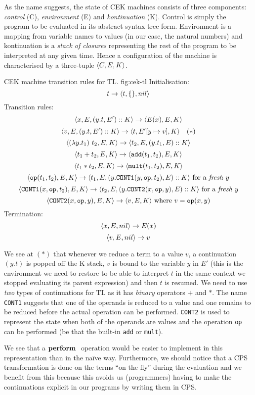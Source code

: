 \documentclass[class=article, crop=false]{standalone}
\begin{document}
As the name suggests, the state of CEK machines consists of three components:
\emph{control} (C), \emph{environment} (E) and \emph{kontinuation} (K). Control
is simply the program to be evaluated in its abstract syntax tree form.
Environment is a mapping from variable names to values (in our case, the natural
numbers) and kontinuation is a \emph{stack of closures} representing the rest
of the program to be interpreted at any given time. Hence a configuration of the
machine is characterised by a three-tuple $\langle C, E, K \rangle$.

\begin{myfigure}[.9]
{CEK machine transition rules for TL.}
{fig:cek-tl}
%
Initialisation:
$$ t \to \langle t, \{\}, nil \rangle $$
%
Transition rules:
$$ \langle x, E, (y.t, E') :: K \rangle \to \langle E(x), E, K \rangle $$
$$ \langle v, E, (y.t, E') :: K \rangle \to \langle t, E'[y \mapsto v], K \rangle \quad (*)$$
$$ \langle (\lambda y. t_1)\ t_2, E, K \rangle \to \langle t_2, E, (y.t_1, E) :: K \rangle $$
$$ \langle t_1 + t_2, E, K \rangle \to \langle \mathtt{add}(t_1, t_2), E, K \rangle $$
$$ \langle t_1 * t_2, E, K \rangle \to \langle \mathtt{mult}(t_1, t_2), E, K \rangle $$
$$ \langle \mathtt{op}(t_1, t_2), E, K \rangle \to \langle t_1, E, (y.\mathtt{CONT1}(y, \mathtt{op}, t_2), E) :: K \rangle \text{ for a \emph{fresh} $y$} $$
$$ \langle \mathtt{CONT1}(x, \mathtt{op}, t_2), E, K \rangle \to \langle t_2, E, (y.\mathtt{CONT2}(x, \mathtt{op}, y), E) :: K \rangle \text{ for a \emph{fresh} $y$} $$
$$ \langle \mathtt{CONT2}(x, \mathtt{op}, y), E, K \rangle \to \langle v, E, K \rangle \text{ where } v = \mathtt{op}(x, y) $$
%
Termination:
$$ \langle x, E, nil \rangle \to E(x) $$
$$ \langle v, E, nil \rangle \to v $$
\end{myfigure}

We see at $(*)$ that whenever we reduce a term to a value $v$, a continuation
$(y.t)$ is popped off the K stack, $v$ is bound to the variable $y$ in $E'$
(this is the environment we need to restore to be able to interpret $t$ in the
same context we stopped evaluating its parent expression) and then $t$ is
resumed. We need to use \emph{two} types of continuations for TL as it has
\emph{binary} operators $+$ and $*$. The name \texttt{CONT1} suggests that one
of the operands is reduced to a value and one remains to be reduced before the
actual operation can be performed. \texttt{CONT2} is used to represent the state
when both of the operands are values and the operation \texttt{op} can be
performed (be that the built-in \texttt{add} or \texttt{mult}).

We see that a $\mathbf{perform}\ $ operation would be easier to implement in this
representation than in the naïve way. Furthermore, we should notice that a CPS
transformation is done on the terms ``on the fly'' during the evaluation and we
benefit from this because this avoids us (programmers) having to make the
continuations explicit in our programs by writing them in CPS.
\end{document}
